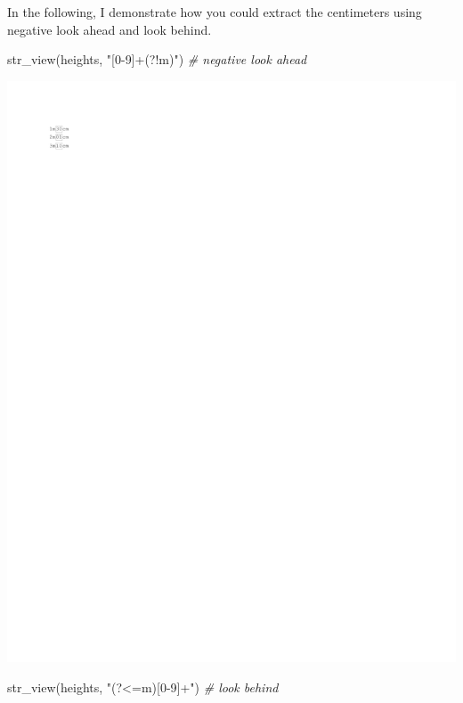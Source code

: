 \documentclass[
]{book}
\newenvironment{Shaded}{\begin{snugshade}}{\end{snugshade}}
\newcommand{\CommentTok}[1]{\textcolor[rgb]{0.56,0.35,0.01}{\textit{#1}}}
\newcommand{\FunctionTok}[1]{\textcolor[rgb]{0.00,0.00,0.00}{#1}}
\newcommand{\NormalTok}[1]{#1}
\newcommand{\StringTok}[1]{\textcolor[rgb]{0.31,0.60,0.02}{#1}}
\begin{document}
In the following, I demonstrate how you could extract the centimeters using negative look ahead and look behind.

\begin{Shaded}
\begin{Highlighting}[]
\FunctionTok{str\_view}\NormalTok{(heights, }\StringTok{"[0{-}9]+(?!m)"}\NormalTok{) }\CommentTok{\# negative look ahead}
\end{Highlighting}
\end{Shaded}

\includegraphics{_main_files/figure-latex/unnamed-chunk-41-1.pdf}

\begin{Shaded}
\begin{Highlighting}[]
\FunctionTok{str\_view}\NormalTok{(heights, }\StringTok{"(?\textless{}=m)[0{-}9]+"}\NormalTok{) }\CommentTok{\# look behind}
\end{Highlighting}
\end{Shaded}
\end{document}
